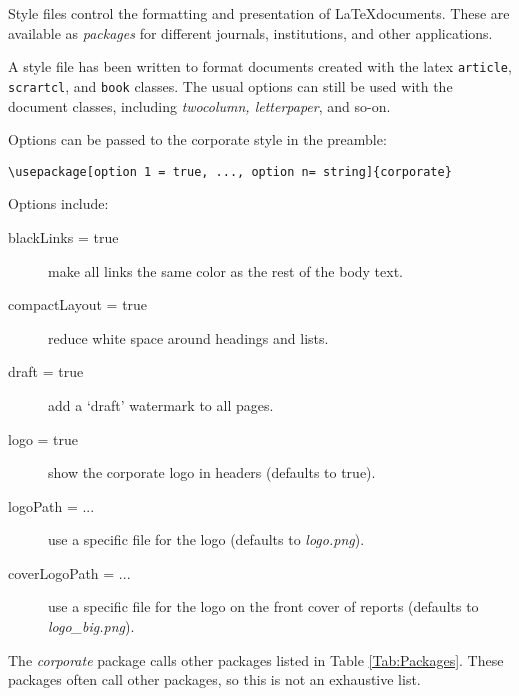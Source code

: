 Style files control the formatting and presentation of \LaTeX documents. These are available as \emph{packages} for different journals, institutions, and other applications. 

A style file has been written to format documents created with the latex \texttt{article}, \texttt{scrartcl}, and \texttt{book} classes. The usual options can still be used with the document classes, including \emph{twocolumn, letterpaper}, and so-on.

Options can be passed to the corporate style in the preamble:

\begin{lstlisting}
\usepackage[option 1 = true, ..., option n= string]{corporate}
\end{lstlisting}

Options include:
\begin{description}
\item[blackLinks = true]{make all links the same color as the rest of the body text.}
\item[compactLayout = true]{reduce white space around headings and lists.}
\item[draft = true]{add a `draft' watermark to all pages.}
\item[logo = true]{show the corporate logo in headers (defaults to true).}
\item[logoPath = ...]{use a specific file for the logo (defaults to \emph{logo.png}).}
\item[coverLogoPath = ...]{use a specific file for the logo on the front cover of reports (defaults to \emph{logo\_big.png}).}
\end{description}

The \emph{corporate} package calls other packages listed in Table \ref{Tab:Packages}. These packages often call other packages, so this is not an exhaustive list.

